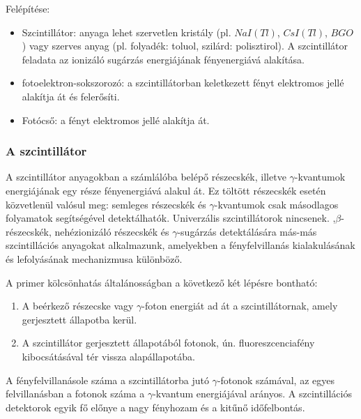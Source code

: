 \documentclass[../main.tex]{subfiles}
\begin{document}
Felépítése:
\begin{itemize}
    \item Szcintillátor: anyaga lehet szervetlen kristály (pl. $NaI(Tl)$, $CsI(Tl)$, $BGO$) vagy szerves anyag (pl. folyadék: toluol, szilárd: polisztirol).
          A szcintillátor feladata az ionizáló sugárzás energiájának fényenergiává alakítása.
    \item fotoelektron-sokszorozó: a szcintillátorban keletkezett fényt elektromos jellé alakítja át és felerősíti.
    \item Fotócső: a fényt elektromos jellé alakítja át.
\end{itemize}

\subsubsection*{A szcintillátor}
A szcintillátor anyagokban a számlálóba belépő részecskék, illetve $\gamma$-kvantumok
energiájának egy része fényenergiává alakul át. Ez töltött részecskék esetén
közvetlenül valósul meg: semleges részecskék és $\gamma$-kvantumok csak másodlagos folyamatok segítségével detektálhatók.
Univerzális szcintillátorok nincsenek. ,$\beta$-részecskék, nehézionizáló részecskék és $\gamma$-sugárzás detektálására más-más szcintillációs anyagokat alkalmazunk,
amelyekben a fényfelvillanás kialakulásának és lefolyásának mechanizmusa különböző.

A primer kölcsönhatás általánosságban a következő két lépésre bontható:
\begin{enumerate}
    \item A beérkező részecske vagy $\gamma$-foton energiát ad át a szcintillátornak, amely gerjesztett állapotba kerül.
    \item A szcintillátor gerjesztett állapotából fotonok, ún. fluoreszcenciafény kibocsátásával tér vissza alapállapotába.
\end{enumerate}

A fényfelvillanásole száma a szcintillátorba jutó $\gamma$-fotonok számával, az
egyes felvillanásban a fotonok száma a $\gamma$-kvantum energiájával arányos.
A szcintillációs detektorok egyik fő előnye a nagy fényhozam és a kitűnő időfelbontás.
\end{document}
